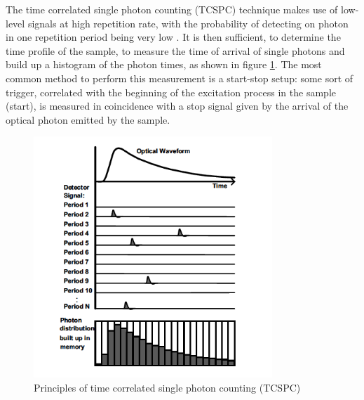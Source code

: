 The time correlated single photon counting (TCSPC) technique makes use of low-level signals at high repetition rate, with the probability of detecting on photon in one repetition period being very low \cite{Becker2005}.
It is then sufficient, to determine the time profile of the sample, to measure the time of arrival of single photons and build up a histogram of the photon times, as shown in figure \ref{fig:tcspc}.
The most common method to perform this measurement is a start-stop setup: some sort of trigger, correlated with the beginning of the excitation process in the sample (start), is measured in coincidence with a stop signal given by the arrival of the optical photon emitted by the sample.
\begin{figure}[htbp]
\begin{center}
\includegraphics[width=9cm]{../Pictures/Chapter_6/tcspc.png}
\end{center}
\caption[TCSPC technique]{Principles of time correlated single photon counting (TCSPC)}
\label{fig:tcspc}
\end{figure}

